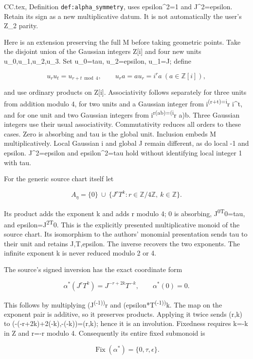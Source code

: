 \documentclass[
]{article}
\begin{document}
CC.tex, Definition \texttt{def:alpha\_symmetry}, uses epsilon\^{}2=1 and
J\^{}2=epsilon. Retain its sign as a new multiplicative datum. It is not
automatically the user's Z\_2 parity.

Here is an extension preserving the full M before taking geometric
points. Take the disjoint union of the Gaussian integers Z{[}i{]} and
four new units u\_0,u\_1,u\_2,u\_3. Set u\_0=tau, u\_2=epsilon, u\_1=J;
define

\[
u_r u_t=u_{r+t\bmod4},\qquad
u_r a=a u_r=i^r a\ (a\in\mathbb Z[i]),
\tag{C2.1}
\]

and use ordinary products on Z{[}i{]}. Associativity follows separately
for three units from addition modulo 4, for two units and a Gaussian
integer from i\textsuperscript{(r+t)=i}r i\^{}t, and for one unit and
two Gaussian integers from i\textsuperscript{r(ab)=(i}r a)b. Three
Gaussian integers use their usual associativity. Commutativity reduces
all orders to these cases. Zero is absorbing and tau is the global unit.
Inclusion embeds M multiplicatively. Local Gaussian i and global J
remain different, as do local -1 and epsilon. J\^{}2=epsilon and
epsilon\^{}2=tau hold without identifying local integer 1 with tau.

For the generic source chart itself let

\[
A_\eta=\{0\}\ \cup\ \{J^rT^k:r\in\mathbb Z/4\mathbb Z,\ k\in\mathbb Z\}.
\tag{C2.2}
\]

Its product adds the exponent k and adds r modulo 4; 0 is absorbing,
J\textsuperscript{0T}0=tau, and epsilon=J\textsuperscript{2T}0. This is
the explicitly presented multiplicative monoid of the source chart. Its
isomorphism to the authors' monomial presentation sends tau to their
unit and retains J,T,epsilon. The inverse recovers the two exponents.
The infinite exponent k is never reduced modulo 2 or 4.

The source's signed inversion has the exact coordinate form

\[
\alpha^*(J^rT^k)=J^{-r+2k}T^{-k},\qquad
\alpha^*(0)=0.
\tag{C2.3}
\]

This follows by multiplying (J\textsuperscript{(-1))}r and
(epsilon*T\textsuperscript{(-1))}k. The map on the exponent pair is
additive, so it preserves products. Applying it twice sends (r,k) to
(-(-r+2k)+2(-k),-(-k))=(r,k); hence it is an involution. Fixedness
requires k=-k in Z and r=-r modulo 4. Consequently its entire fixed
submonoid is

\[
\operatorname{Fix}(\alpha^*)=\{0,\tau,\epsilon\}.
\tag{C2.4}
\]
\end{document}
